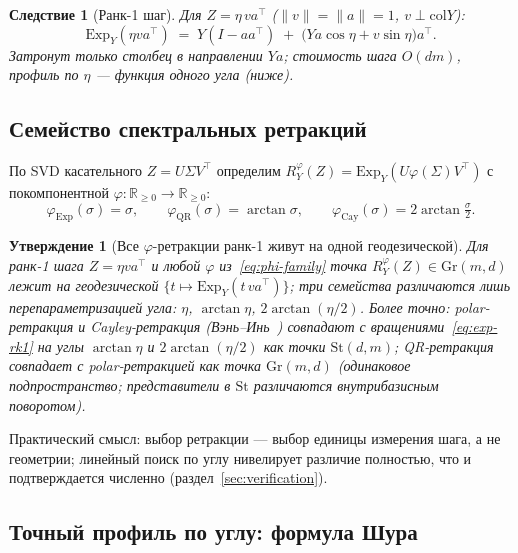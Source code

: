 \documentclass[11pt,a4paper]{article}
\newcommand{\R}{\mathbb{R}}
\newcommand{\Id}{I}
\newcommand{\T}{^{\!\top}}
\newcommand{\Gr}{\mathrm{Gr}}
\newcommand{\St}{\mathrm{St}}
\newcommand{\Exp}{\mathrm{Exp}}
\newcommand{\col}{\mathrm{col}}
\theoremstyle{plain}
\newtheorem{prop}[theorem]{Утверждение}
\newtheorem{corollary}[theorem]{Следствие}
\theoremstyle{definition}
\theoremstyle{remark}
\begin{document}
\begin{corollary}[Ранк-1 шаг]\label{cor:rk1-geo}
Для $Z=\eta\,va\T$ ($\|v\|=\|a\|=1$, $v\perp\col Y$):
\begin{equation}\label{eq:exp-rk1}
\Exp_Y(\eta va\T)\;=\;Y(\Id-aa\T)\;+\;\bigl(Ya\cos\eta+v\sin\eta\bigr)a\T .
\end{equation}
Затронут только столбец в направлении $Ya$; стоимость шага $O(dm)$, профиль
по $\eta$ --- функция одного угла (ниже).
\end{corollary}

\subsection{Семейство спектральных ретракций}

По SVD касательного $Z=U\Sigma V\T$ определим
$R^\varphi_Y(Z)=\Exp_Y(U\varphi(\Sigma)V\T)$ с покомпонентной
$\varphi:\R_{\ge0}\to\R_{\ge0}$:
\begin{equation}\label{eq:phi-family}
\varphi_{\mathrm{Exp}}(\sigma)=\sigma,\qquad
\varphi_{\mathrm{QR}}(\sigma)=\arctan\sigma,\qquad
\varphi_{\mathrm{Cay}}(\sigma)=2\arctan\tfrac{\sigma}{2}.
\end{equation}

\begin{prop}[Все $\varphi$-ретракции ранк-1 живут на одной геодезической]\label{prop:phi}
Для ранк-1 шага $Z=\eta va\T$ и любой $\varphi$ из~\eqref{eq:phi-family}
точка $R^\varphi_Y(Z)\in\Gr(m,d)$ лежит на геодезической
$\{t\mapsto\Exp_Y(t\,va\T)\}$; три семейства различаются лишь
перепараметризацией угла: $\eta$, $\arctan\eta$, $2\arctan(\eta/2)$.
Более точно: polar-ретракция и Cayley-ретракция (Вэнь--Инь~\cite{wen-yin-2013})
совпадают с вращениями~\eqref{eq:exp-rk1} на углы $\arctan\eta$ и
$2\arctan(\eta/2)$ \emph{как точки} $\St(d,m)$; QR-ретракция совпадает с
polar-ретракцией \emph{как точка} $\Gr(m,d)$ (одинаковое подпространство;
представители в $\St$ различаются внутрибазисным поворотом).
\end{prop}

Практический смысл: выбор ретракции --- выбор единицы измерения шага, а не
геометрии; линейный поиск по углу нивелирует различие полностью, что и
подтверждается численно (раздел~\ref{sec:verification}).

\subsection{Точный профиль по углу: формула Шура}
\end{document}
